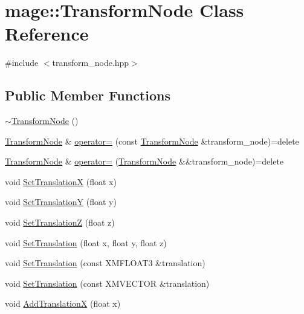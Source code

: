\hypertarget{classmage_1_1_transform_node}{}\section{mage\+:\+:Transform\+Node Class Reference}
\label{classmage_1_1_transform_node}


{\ttfamily \#include $<$transform\+\_\+node.\+hpp$>$}

\subsection*{Public Member Functions}
\begin{DoxyCompactItemize}
\item 
\hyperlink{classmage_1_1_transform_node_a0c5e84d99c27cda31dae8106611d682f}{$\sim$\+Transform\+Node} ()
\item 
\hyperlink{classmage_1_1_transform_node}{Transform\+Node} \& \hyperlink{classmage_1_1_transform_node_a1514dd4dc3ca63725ead2a196b2c6c89}{operator=} (const \hyperlink{classmage_1_1_transform_node}{Transform\+Node} \&transform\+\_\+node)=delete
\item 
\hyperlink{classmage_1_1_transform_node}{Transform\+Node} \& \hyperlink{classmage_1_1_transform_node_a48c94a56f7d6693a5b6ca61841084249}{operator=} (\hyperlink{classmage_1_1_transform_node}{Transform\+Node} \&\&transform\+\_\+node)=delete
\item 
void \hyperlink{classmage_1_1_transform_node_ae8c70df952ab17950a48decbc14ab09d}{Set\+TranslationX} (float x)
\item 
void \hyperlink{classmage_1_1_transform_node_a299fab4e618c7221569ebe65a7f8320e}{Set\+TranslationY} (float y)
\item 
void \hyperlink{classmage_1_1_transform_node_aa774136e2965eb5474d7cc326c3e987a}{Set\+TranslationZ} (float z)
\item 
void \hyperlink{classmage_1_1_transform_node_aadda64b3fecda3f19535c6cad6b03721}{Set\+Translation} (float x, float y, float z)
\item 
void \hyperlink{classmage_1_1_transform_node_a2e6a7a640f14c504601fe0ed614e8467}{Set\+Translation} (const X\+M\+F\+L\+O\+A\+T3 \&translation)
\item 
void \hyperlink{classmage_1_1_transform_node_a0a6d54024fa758d7c4412e53e467b00c}{Set\+Translation} (const X\+M\+V\+E\+C\+T\+OR \&translation)
\item 
void \hyperlink{classmage_1_1_transform_node_a16f2077647c4a0f7f1f27e11ba7dbf37}{Add\+TranslationX} (float x)

\end{DoxyCompactItemize}
